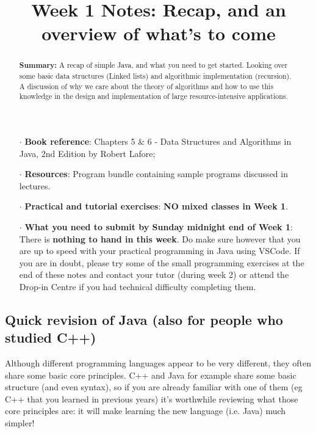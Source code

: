 \documentclass[twoside=false,DIV=14]{scrartcl}
\title{\color{redish} \vspace{-2em}Week 1 Notes: Recap, and an overview of what's to come}
\begin{document}
{\color{blackish}\maketitle}\vspace{-2em}%

\begin{abstract}
{\bf Summary:}  
A recap of simple Java, and what you need to get started. Looking over some basic data structures (Linked lists) and algorithmic implementation (recursion). A discussion of why we care about the theory of algorithms and how to use this knowledge in the design and implementation of large resource-intensive applications.
\end{abstract}

\begin{itemize}
\item[$\cdot$] {\bf Book reference}: Chapters 5 \& 6 - Data Structures and Algorithms in Java, 2nd Edition by Robert Lafore;
\item[$\cdot$] {\bf Resources}:  Program bundle containing sample programs discussed in lectures.

\item[$\cdot$] {\bf Practical and tutorial exercises}:   {\bf NO mixed classes in Week 1}. 


\item[$\cdot$] {\bf What you need to submit by Sunday midnight end of Week 1}:  There is {\bf nothing to hand in this week}. Do make sure however that
you are up to speed with your practical programming in Java using VSCode.  If you are in doubt, please try some of the small programming exercises at the end of these notes and contact your tutor (during week 2) or attend the Drop-in Centre if you had technical difficulty completing them.
\end{itemize}


\subsection*{Quick revision of Java (also for people who studied C++)}

Although different programming languages appear to be very different, they often share some basic core principles. C++ and Java for example share some basic structure (and even syntax), so if you are already familiar with one of them (eg  C++ that you learned in previous years) it's worthwhile reviewing what those core principles are: it will make learning the new language (i.e. Java) much simpler!
\end{document}
